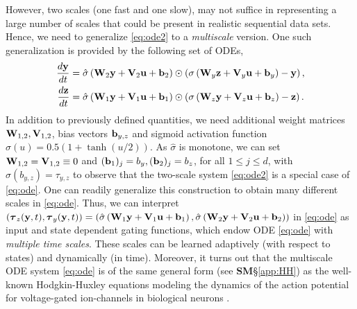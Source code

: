 \documentclass{article} \usepackage{iclr2022_conference,times}
\newcommand{\by}{{\bf y}}
\newcommand{\bz}{{\bf z}}
\newcommand{\bW}{{\bf W}}
\newcommand{\bu}{{\bf u}}
\newcommand{\bb}{{\bf b}}
\newcommand{\bV}{{\bf V}}
\begin{document}
However, two scales (one fast and one slow), may not suffice in representing a large number of scales that could be present in realistic sequential data sets. Hence, we need to generalize \eqref{eq:ode2} to a \emph{multiscale} version. One such generalization is provided by the following set of ODEs,
\begin{equation}
    \label{eq:ode}
    \begin{aligned}
    \frac{d\by}{dt} &= \hat{\sigma}\left(\bW_2\by + \bV_2\bu + \bb_2\right)\odot \left(\sigma\left(\bW_y \bz + \bV_y \bu + \bb_y\right) - \by\right), \\
    \frac{d\bz}{dt} &= \hat{\sigma}\left(\bW_1\by + \bV_1\bu + \bb_1\right)\odot \left(\sigma\left(\bW_z \by + \bV_z \bu + \bb_z\right) - \bz\right). 
    \end{aligned}
\end{equation}
In addition to previously defined quantities, we need additional weight matrices $\bW_{1,2},\bV_{1,2}$, bias vectors $\bb_{y,z}$ and sigmoid activation function $\hat{\sigma}(u) = 0.5(1+\tanh(u/2))$. 
As $\hat{\sigma}$ is monotone, we can set $\bW_{1,2} = \bV_{1,2} \equiv 0$ and $(\bb_1)_j = b_y, (\bb_2)_j = b_z$, for all $1 \leq j \leq d$, with $\hat{\sigma}(b_{y,z})=\tau_{y,z}$ to observe that the two-scale system \eqref{eq:ode2} is a special case of \eqref{eq:ode}. 
One can readily generalize this construction to obtain many different scales in \eqref{eq:ode}. 
Thus, we can interpret $\left({\boldsymbol{\tau}}_{z}(\by,t), {\boldsymbol{\tau}}_{y}(\by,t)\right)=  \left(\hat{\sigma}\left(\bW_{1}\by + \bV_1\bu + \bb_1\right),\hat{\sigma}\left(\bW_{2}\by + \bV_2\bu + \bb_2\right)\right)$ in \eqref{eq:ode} as input and state dependent gating functions, which endow ODE \eqref{eq:ode} with \emph{multiple time scales}.
These scales can be learned adaptively (with respect to states) and dynamically (in time). Moreover, it turns out that the multiscale ODE system \eqref{eq:ode} is of the same general form (see {\bf SM}\S\ref{app:HH}) as the well-known Hodgkin-Huxley equations modeling the dynamics of the action potential for voltage-gated ion-channels in biological neurons \citep{HH}. 
\end{document}
